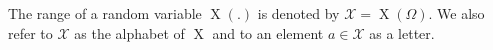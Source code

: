 The range of a random variable $\operatorname{X}(.)$ is denoted by $\mathcal{X} = \operatorname{X}(\Omega)$.  We also refer to $\mathcal{X}$ as the alphabet of $\operatorname{X}$ and to an element $a \in \mathcal{X}$ as a letter.
